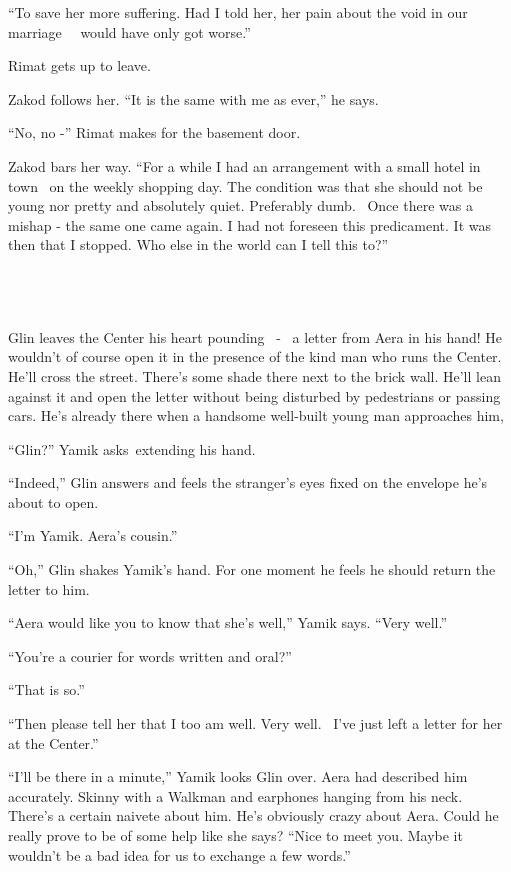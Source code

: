 \documentclass[twoside,11pt]{book}
\begin{document}
``To save her more suffering. Had I told her, her pain about the void in our marriage \ \ would have only
got worse.''

Rimat gets up to leave.

Zakod follows her. ``It is the same with me as ever,'' he says.

``No, no -'' Rimat makes for the basement door.

Zakod bars her way. ``For a while I had an arrangement with a small hotel in town \ on the weekly shopping
day. The condition was that she should not be young nor pretty and absolutely quiet. Preferably dumb. ~Once there was a
mishap - the same one came again. I had not foreseen this predicament. It was then that I stopped. Who else in the
world can I tell this to?''

~

\chapter{}

Glin leaves the Center his heart pounding \ {}- \ a letter from Aera in his hand! He wouldn't of course open it in the
presence of the kind man who runs the Center. He'll cross the street. There's some shade there next to the brick wall.
He'll lean against it and open the letter without being disturbed by pedestrians or passing cars. He's already there
when a handsome well-built young man approaches him,~

``Glin?'' Yamik asks~extending his hand.

``Indeed,'' Glin answers and feels the stranger's eyes fixed on the envelope he's about to
open.

``I'm Yamik. Aera's cousin.''

``Oh,'' Glin shakes Yamik's hand. For one moment he feels he should return the letter to him.
~

``Aera would like you to know that she's well,'' Yamik says. ``Very
well.''

``You're a courier for words written and oral?''

``That is so.''

``Then please tell her that I too am well. Very well.~ I've just left a letter for her at the
Center.''

``I'll be there in a minute,'' Yamik looks Glin over. Aera had described him accurately.
Skinny with a Walkman and earphones hanging from his neck. There's a certain naivete about him. He's obviously crazy
about Aera. Could he really prove to be of some help like she says? ``Nice to meet you. Maybe it wouldn't
be a bad idea for us to exchange a few words.''
\end{document}
